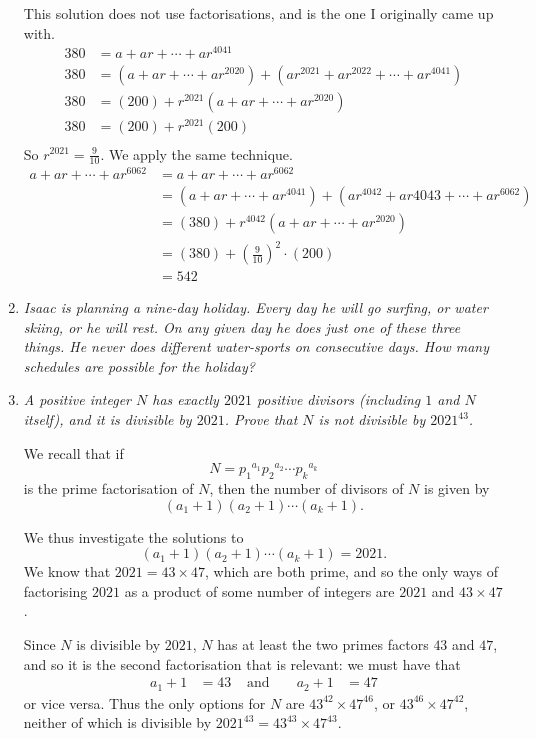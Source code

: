 \documentclass{article}
\begin{document}
\begin{enumerate}[1.]
This solution does not use factorisations, and is the one I originally came up with.
\begin{align*}
380 &= a +ar + \dotsb +ar^{4041}\\
380 &= (a +ar +\dotsb +ar^{2020}) + (ar^{2021} + ar^{2022} + \dotsb + ar^{4041})\\
380 &= (200) + r^{2021}(a + ar + \dotsb + ar^{2020})\\
380 &= (200) + r^{2021}(200)\\
\end{align*}
So $r^{2021} = \frac{9}{10}$. We apply the same technique.
\begin{align*}
a +ar + \dotsb +ar^{6062} &= a + ar + \dotsb +ar^{6062}\\
&= (a +ar +\dotsb +ar^{4041}) + (ar^{4042} + ar{4043} +  \dotsb + ar^{6062})\\
&= (380) + r^{4042}(a + ar + \dotsb + ar^{2020})\\
&= (380) + \left(\frac{9}{10}\right)^2\cdot(200)\\
&= 542
\end{align*}
  
  \item %
  {\itshape Isaac is planning a nine-day holiday. Every day he will go surfing, or water skiing, or he will rest. On any given day he does just one of these three things. He never does different water-sports on consecutive days. How many schedules are possible for the holiday?}
  
  
  \item %
  {\itshape A positive integer $N$ has exactly $2021$ positive divisors (including $1$ and $N$ itself), and it is divisible by $2021$.
  Prove that $N$ is not divisible by $2021^{43}$.}

  We recall that if
  \[
    N = {p_1}^{a_1} {p_2}^{a_2} \cdots {p_k}^{a_k}
  \]
  is the prime factorisation of $N$, then the number of divisors of $N$ is given by
  \[
    (a_1 + 1)(a_2 + 1) \cdots (a_k + 1).
  \]

  We thus investigate the solutions to
  \[
    (a_1 + 1)(a_2 + 1) \cdots (a_k + 1) = 2021.
  \]
  We know that $2021 = 43 \times 47$, which are both prime, and so the only ways of factorising $2021$ as a product of some number of integers are $2021$ and $43 \times 47$.

  Since $N$ is divisible by $2021$, $N$ has at least the two primes factors $43$ and $47$, and so it is the second factorisation that is relevant: we must have that
  \begin{align*}
    a_1 + 1 & = 43 & \text{ and } && a_2 + 1 & = 47
  \end{align*}
  or vice versa. Thus the only options for $N$ are $43^{42} \times 47^{46}$, or $43^{46} \times 47^{42}$, neither of which is divisible by $2021^{43} = 43^{43} \times 47^{43}$.
    

\end{enumerate}
\end{document}
